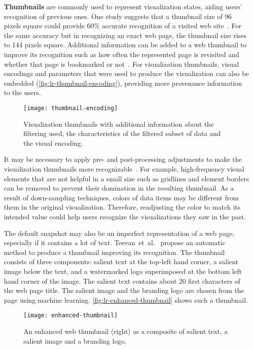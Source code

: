 \textbf{Thumbnails} are commonly used to represent visualization states, aiding users' recognition of previous ones. One study suggests that a thumbnail size of 96 pixels square could provide 60\% accurate recognition of a visited web site~\cite{Kaasten2001}. For the same accuracy but in recognizing an exact web page, the thumbnail size rises to 144 pixels square. Additional information can be added to a web thumbnail to improve its recognition such as how often the represented page is revisited and whether that page is bookmarked or not~\cite{Cockburn1999}. For visualization thumbnails, visual encodings and parameters that were used to produce the visualization can also be embedded (\autoref{fig:lr-thumbnail-encoding}), providing more provenance information to the users.

\begin{figure}
	\centering
	\texttt{[image: thumbnail-encoding]}
	\caption[Visualization thumbnails]{Visualization thumbnails with additional information about the filtering used, the characteristics of the filtered subset of data and the visual encoding. }
	\label{fig:lr-thumbnail-encoding}
\end{figure}

It may be necessary to apply pre- and post-processing adjustments to make the visualization thumbnails more recognizable~\cite{Heer2008}. For example, high-frequency visual elements that are not helpful in a small size such as gridlines and element borders can be removed to prevent their domination in the resulting thumbnail. As a result of down-sampling techniques, colors of data items may be different from them in the original visualization. Therefore, readjusting the color to match its intended value could help users recognize the visualizations they saw in the past.

The default snapshot may also be an imperfect representation of a web page, especially if it contains a lot of text. Teevan~et~al.~\cite{Teevan2009} propose an automatic method to produce a thumbnail improving its recognition. The thumbnail consists of three components: salient text at the top-left hand corner, a salient image below the text, and a watermarked logo superimposed at the bottom left hand corner of the image. The salient text contains about 20 first characters of the web page title. The salient image and the branding logo are chosen from the page using machine learning. \autoref{fig:lr-enhanced-thumbnail} shows such a thumbnail.

\begin{figure}
	\centering
	\texttt{[image: enhanced-thumbnail]}
	\caption[An enhanced web thumbnail]{An enhanced web thumbnail (right) as a composite of salient text, a salient image and a branding logo. }
	\label{fig:lr-enhanced-thumbnail}
\end{figure}

